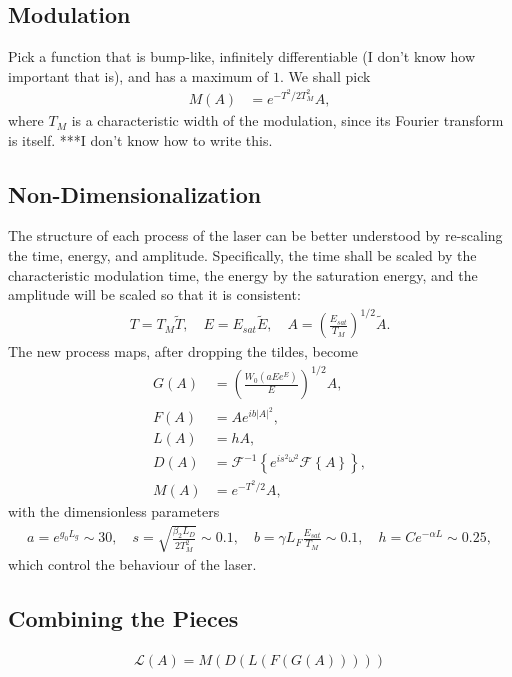 \documentclass[12pt]{article}
\newcommand{\Es}{E_{sat}}
\newcommand{\FT}[1]{\mathcal{F}\left\{ #1 \right\}}
\newcommand{\FTi}[1]{\mathcal{F}^{-1}\left\{ #1 \right\}}
\begin{document}
\subsection{Modulation}
Pick a function that is bump-like, infinitely differentiable (I don't know how important that is), and has a maximum of $1$. We shall pick
\begin{align*}
M(A) &= e^{-T^2 / 2 T_M^2} A,
\end{align*}
where $T_M$ is a characteristic width of the modulation, since its Fourier transform is itself. ***I don't know how to write this.

\subsection{Non-Dimensionalization}
The structure of each process of the laser can be better understood by re-scaling the time, energy, and amplitude. Specifically, the time shall be scaled by the characteristic modulation time, the energy by the saturation energy, and the amplitude will be scaled so that it is consistent:
\begin{align*}
T = T_M \widetilde{T}, \quad E = \Es \widetilde{E}, \quad A = \left( \frac{\Es}{T_M} \right)^{1/2} \widetilde{A}.
\end{align*}
The new process maps, after dropping the tildes, become
\begin{align*}
G(A) &= \left( \frac{W_0 \left( a E e^{E}\right)}{E} \right)^{1/2} A, \\
F(A) &= A e^{i b |A|^2}, \\
L(A) &= h A, \\
D(A) &= \FTi{e^{i s^2 \omega^2} \FT{A}}, \\
M(A) &= e^{-T^2 / 2} A,
\end{align*}
with the dimensionless parameters
\begin{align*}
a = e^{g_0 L_g} \sim 30, \quad s = \sqrt{\frac{\beta_2 L_D}{2 T_M^2}} \sim 0.1, \quad b = \gamma L_F \frac{\Es}{T_M} \sim 0.1, \quad h = C e^{-\alpha L} \sim 0.25,
\end{align*}
which control the behaviour of the laser.

\subsection{Combining the Pieces}

\begin{align*}
\mathcal{L}(A) = M(D(L(F(G(A)))))
\end{align*}
\end{document}
